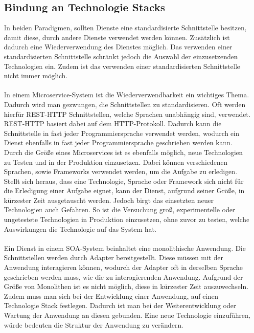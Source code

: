\subsection{Bindung an Technologie Stacks}
\label{subsec:BindungAnTechnologiestacks}
In beiden Paradigmen, sollten Dienste eine standardisierte Schnittstelle besitzen, damit diese, durch andere Dienste verwendet werden können. Zusätzlich ist dadurch eine Wiederverwendung des Dienstes möglich. Das verwenden einer standardisierten Schnittstelle schränkt jedoch die Auswahl der einzusetzenden Technologien ein. Zudem ist das verwenden einer standardisierten Schnittstelle nicht immer möglich.
\\\\
In einem Microservice-System ist die Wiederverwendbarkeit ein wichtiges Thema. Dadurch wird man gezwungen, die Schnittstellen zu standardisieren. Oft werden hierfür REST-HTTP Schnittstellen, welche Sprachen unabhängig sind, verwendet. REST-HTTP basiert dabei auf dem HTTP-Protokoll. Dadurch kann die Schnittstelle in fast jeder Programmiersprache verwendet werden, wodurch ein Dienst ebenfalls in fast jeder Programmiersprache geschrieben werden kann. Durch die Größe eines Microservices ist es ebenfalls möglich, neue Technologien zu Testen und in der Produktion einzusetzen. Dabei können verschiedenen Sprachen, sowie Frameworks verwendet werden, um die Aufgabe zu erledigen. Stellt sich heraus, dass eine Technologie, Sprache oder Framework sich nicht für die Erledigung einer Aufgabe eignet, kann der Dienst, aufgrund seiner Größe, in kürzester Zeit ausgetauscht werden. Jedoch birgt das einsetzten neuer Technologien auch Gefahren. So ist die Versuchung groß, experimentelle oder ungetestete Technologien in Produktion einzusetzen, ohne zuvor zu testen, welche Auswirkungen die Technologie auf das System hat.
\\\\
Ein Dienst in einem SOA-System beinhaltet eine monolithische Anwendung. Die Schnittstellen werden durch Adapter bereitgestellt. Diese müssen mit der Anwendung interagieren können, wodurch der Adapter oft in derselben Sprache geschrieben werden muss, wie die zu interagierenden Anwendung. Aufgrund der Größe von Monolithen ist es nicht möglich, diese in kürzester Zeit auszuwechseln. Zudem muss man sich bei der Entwicklung einer Anwendung, auf einen Technologie Stack festlegen. Dadurch ist man bei der Weiterentwicklung oder Wartung der Anwendung an diesen gebunden. Eine neue Technologie einzuführen, würde bedeuten die Struktur der Anwendung zu verändern.

